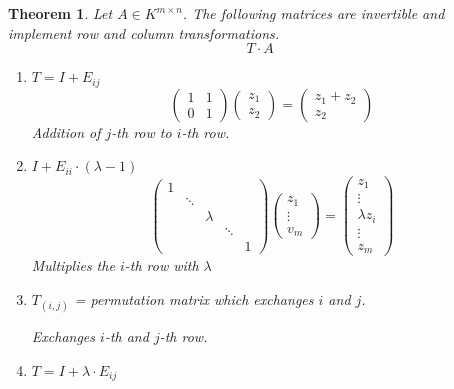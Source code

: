 \documentclass[a4paper,landscape,twocolumn]{article}
\newtheorem{theorem}{Theorem}
\begin{document}
\begin{theorem}
  \label{satz-6.27}
  Let $A \in K^{m\times n}$. The following matrices are invertible and implement
  row and column transformations.
  \[ T \cdot A \]
  \begin{enumerate}
    \item $T = I + E_{ij}$
      \[
        \begin{pmatrix}
          1 & 1 \\
          0 & 1
        \end{pmatrix}
        \begin{pmatrix}
          z_1 \\
          z_2
        \end{pmatrix}
        = \begin{pmatrix}
          z_1 + z_2 \\
          z_2
        \end{pmatrix}
      \]
      Addition of $j$-th row to $i$-th row.
    \item $I + E_{ii} \cdot (\lambda - 1)$
      \[
        \begin{pmatrix}
          1 &        &         &        & \\
            & \ddots &         &        & \\
            &        & \lambda &        & \\
            &        &         & \ddots & \\
            &        &         &        & 1
        \end{pmatrix}
        \begin{pmatrix}
          z_1 \\
          \vdots \\
          v_m
        \end{pmatrix}
        =
        \begin{pmatrix}
          z_1 \\
          \vdots \\
          \lambda z_i \\
          \vdots \\
          z_m
        \end{pmatrix}
      \]
      Multiplies the $i$-th row with $\lambda$
    \item $T_{(i,j)}$ = permutation matrix which exchanges $i$ and $j$.

      Exchanges $i$-th and $j$-th row.
    \item $T = I + \lambda \cdot E_{ij}$


\end{enumerate}
\end{theorem}
\end{document}

